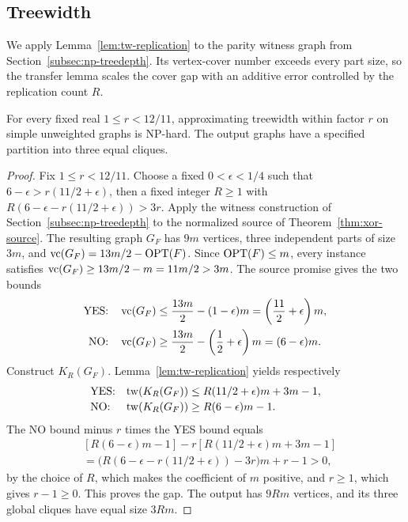 \subsection{Treewidth}
\label{subsec:np-treewidth}

We apply Lemma~\ref{lem:tw-replication} to the parity witness graph
from Section~\ref{subsec:np-treedepth}. Its vertex-cover number exceeds
every part size, so the transfer lemma scales the cover gap with an
additive error controlled by the replication count $R$.

\begin{theorem}\label{thm:tw-hardness}
For every fixed real $1\leq r<12/11$, approximating treewidth within
factor $r$ on simple unweighted graphs is \textup{NP}-hard. The output graphs
have a specified partition into three equal cliques.
\end{theorem}

\begin{proof}
Fix $1\le r<12/11$. Choose a fixed $0<\epsilon<1/4$ such that
$6-\epsilon>r(11/2+\epsilon)$, then a fixed integer $R\ge1$ with
$R(6-\epsilon-r(11/2+\epsilon))>3r$.
Apply the witness construction of Section~\ref{subsec:np-treedepth} to
the normalized source of Theorem~\ref{thm:xor-source}. The resulting
graph $G_F$ has $9m$ vertices, three independent parts of size $3m$, and
$\operatorname{vc}(G_F)=13m/2-\operatorname{OPT}(F)$.
Since $\operatorname{OPT}(F)\leq m$, every instance satisfies
$\operatorname{vc}(G_F)\geq13m/2-m=11m/2>3m$. The source promise gives the two bounds
\[
\begin{aligned}
 \textup{YES:}\quad
 \operatorname{vc}(G_F)&\leq\frac{13m}{2}-(1-\epsilon)m
 =\left(\frac{11}{2}+\epsilon\right)m,\\
 \textup{NO:}\quad
 \operatorname{vc}(G_F)&\geq\frac{13m}{2}-\left(\frac12+\epsilon\right)m
 =(6-\epsilon)m.
\end{aligned}
\]
Construct $K_R(G_F)$.
Lemma~\ref{lem:tw-replication} yields respectively
\[
 \begin{array}{ll}
 \textup{YES:}&\operatorname{tw}(K_R(G_F))
       \leq R(11/2+\epsilon)m+3m-1,\\[2pt]
 \textup{NO:}&\operatorname{tw}(K_R(G_F))
       \geq R(6-\epsilon)m-1.
 \end{array}
\]
The NO bound minus $r$ times the YES bound equals
\[
\begin{aligned}
 &[R(6-\epsilon)m-1]
   -r[R(11/2+\epsilon)m+3m-1]\\
 &=\bigl(R(6-\epsilon-r(11/2+\epsilon))-3r\bigr)m+r-1>0,
\end{aligned}
\]
by the choice of $R$, which makes the coefficient of $m$ positive,
and $r\ge1$, which gives $r-1\ge0$. This proves the gap.
The output has $9Rm$ vertices, and its three global cliques have
equal size $3Rm$. 
\end{proof}

